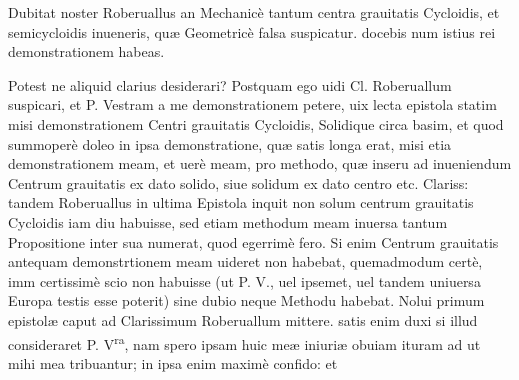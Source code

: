 \documentclass[11pt,a4paper]{article}
\begin{document}
Dubitat noster Roberuallus an Mechanicè tantum centra grauitatis Cycloidis, et semicycloidis inueneris, quæ Geometricè falsa suspicatur. docebis num istius rei demonstrationem habeas.

Potest ne aliquid clarius desiderari? Postquam ego uidi Cl. Roberuallum suspicari, et P. Vestram a me demonstrationem petere, uix lecta epistola statim misi demonstrationem Centri grauitatis Cycloidis, Solidique circa basim, et quod summoperè doleo in ipsa demonstratione, quæ satis longa erat, misi etia demonstrationem meam, et uerè meam, pro methodo, quæ inseru ad inueniendum Centrum grauitatis ex dato solido, siue solidum ex dato centro etc. Clariss: tandem Roberuallus in ultima Epistola inquit non solum centrum grauitatis Cycloidis iam diu habuisse, sed etiam methodum meam inuersa tantum Propositione inter sua numerat, quod egerrimè fero. Si enim Centrum grauitatis antequam demonstrtionem meam uideret non habebat, quemadmodum certè, imm certissimè scio non habuisse (ut P. V., uel ipsemet, uel tandem uniuersa Europa testis esse poterit) sine dubio neque Methodu habebat. Nolui primum epistolæ caput ad Clarissimum Roberuallum mittere. satis enim duxi si illud consideraret P. V\textsuperscript{ra}, nam spero ipsam huic meæ iniuriæ obuiam ituram ad ut mihi mea tribuantur; in ipsa enim maximè confido: et

\end{document}
